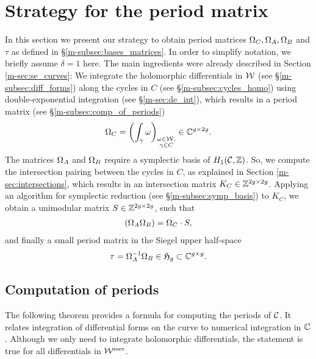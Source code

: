 \documentclass[main.tex]{subfiles}
\begin{document}
  \section{Strategy for the period matrix}\label{sec:strat_pm}

  In this section we present our strategy to obtain period matrices $\Omega_C, \Omega_A, \Omega_B$ and $\tau$ as defined in \S \ref{m-subsec:bases_matrices}. In order to simplify notation,
  we briefly assume $\delta = 1$ here. The main ingredients were already described in
  Section \ref{m-sec:se_curves}: \abstand We integrate the holomorphic differentials in $\mathcal{W}$ (see \S \ref{m-subsec:diff_forms})
  along the cycles in $C$ (see  \S \ref{m-subsec:cycles_homo}) using double-exponential integration (see \S \ref{m-sec:de_int}), which results in a period matrix (see \S \ref{m-subsec:comp_of_periods})
  \begin{align}
    \Omega_C = \left( \int_{\gamma} \omega \right)_{\substack{\omega \in \mathcal{W}, \\ \gamma \in C}} \in \mathbb{C}^{g \times 2g}.
  \end{align}
  The matrices $\Omega_A$ and $\Omega_B$ require a symplectic basis of $H_1(\mathcal{C},\mathbb{Z})$.
  So, we compute the intersection pairing between the cycles in $C$, as explained in Section \ref{m-sec:intersections}, which results in an
  intersection matrix $K_C \in \mathbb{Z}^{2g \times 2g}$. \abstand
  Applying an algorithm for symplectic reduction (see \S \ref{m-subsec:symp_basis}) to $K_C$, we obtain a unimodular matrix $S \in \mathbb{Z}^{2g \times 2g}$, such that
  \begin{align}
   (  \Omega_A  \Omega_B  ) = \Omega_C \cdot S,
   \end{align}
   and finally a small period matrix in the Siegel upper half-space
   \begin{align}
   \tau = \Omega_A^{-1} \Omega_B \in \mathfrak{H}_g \subset \mathbb{C}^{g \times g}.
  \end{align}

  \bigskip

  \subsection{Computation of periods}\label{subsec:comp_of_periods}

  The following theorem provides a formula for computing the periods of $\mathcal{C}$. It relates integration of differential forms on the curve to numerical integration in $\mathbb{C}$.
  Although we only need to integrate holomorphic
  differentials, the statement is true for all differentials in $\mathcal{W}^{\text{mer}}$.
\end{document}
